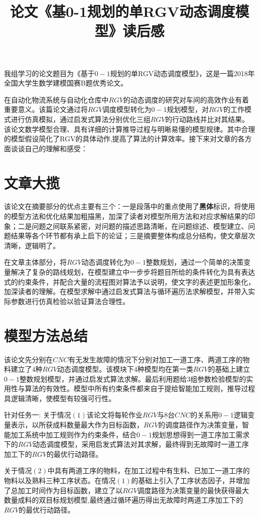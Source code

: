 \documentclass{whutmod}
\title{论文《基0-1规划的单RGV动态调度模型》读后感}
\begin{document}
	
	\Large   
	我组学习的论文题目为《基于$0-1$规划的单RGV动态调度模型》，这是一篇2018年全国大学生数学建模国赛B题优秀论文。
	
	在自动化物流系统与自动化仓库中$RGV$的动态调度的研究对车间的高效作业有着重要意义。该篇论文通过将$RGV$调度模型转化为$0-1$规划模型，对$RGV$的工作模式进行仿真模拟，通过启发式算法分别优化三组$RGV$的行动路线并比对其结果。该论文数学模型合理、具有详细的计算推导过程与明晰易懂的模型规律。其中合理的模型假设简化了RGV的具体动作,提高了算法的计算效率。接下来对文章的各方面谈谈自己的理解和感受：
	
	\section{文章大揽}
	该论文在摘要部分的优点主要有三个：一是段落中的重点使用了\textbf{黑体}标识，将使用的模型方法和优化结果加粗描黑，加深了读者对模型所用方法和对应求解结果的印象；二是问题之间联系紧密，对问题的描述思路清晰，在问题综述、模型建立、问题结果等各个环节都有承上启下的论证；三是摘要整体构成总分结构，使文章层次清晰，逻辑明了。
	
	在文章主体部分，将$RGV$动态调度转化为$0-1$整数规划，通过一个简单的决策变量解决了复杂的路线规划，在模型建立中一步步将题目所给的条件转化为具有表达式的约束条件，并配合大量的流程图对算法予以说明，使文字的表述更加形象化，加深读者的理解。在模型求解中通过启发式算法与循环遍历法求解模型，并带入实际参数进行仿真检验以验证算法合理性。
	
	
	\section{模型方法总结}
	该论文先分别在$CNC$有无发生故障的情况下分别对加工一道工序、两道工序的物料建立了$4$种$RGV$动态调度模型。该模块下$4$种模型均在第一类$RGV$的基础上建立$0-1$整数规划模型，并通过启发式算法求解。最后利用题给$3$组参数检验模型的实用性与算法的有效性。模型中所有约束条件都来自于提给智能加工规则，推导过程具逻辑清晰，使模型有较强可行性。
	
	针对任务一:
	关于情况$(1)$该论文将每轮作业$RGV$与$8$台$CNC$的关系用$0-1$逻辑变量表示，以所获成料数量最大作为目标函数，$RGV$的调度路径作为决策变量，智能加工系统中加工规则作为约束条件，结合$0-1$规划思想得到一道工序加工需求下的$RGV$动态调度模型，采用启发式算法对其求解，最终得到无故障时一道工序加工下的$RGV$的最优行动路径。
	
	关于情况$(2)$中具有两道工序的物料，在加工过程中有生料、已加工一道工序的物料以及熟料三种工序状态。在情况$(1)$的基础上引入了工序状态因子，并增加了总加工时间作为目标函数，建立了以$RGV$调度路径为决策变量的最快获得最大数量成料的双目标规划模型,最终通过循环遍历得出无故障时两道工序加工下的$RGV$的最优行动路径。
	
\end{document}
